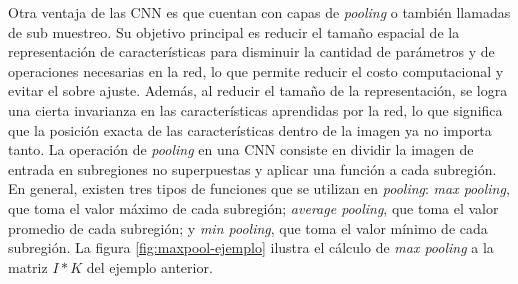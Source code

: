 Otra ventaja de las CNN es que cuentan con capas de {\it pooling} o también llamadas de sub muestreo. Su objetivo
principal es reducir el tamaño espacial de la representación de características para disminuir la cantidad de
parámetros y de operaciones necesarias en la red, lo que permite reducir el costo computacional y evitar el sobre
ajuste. Además, al reducir el tamaño de la representación, se logra una cierta invarianza en las características
aprendidas por la red, lo que significa que la posición exacta de las características dentro de la imagen ya no importa
tanto. La operación de {\it pooling} en una CNN consiste en dividir la imagen de entrada en subregiones no superpuestas
y aplicar una función a cada subregión. En general, existen tres tipos de funciones que se utilizan en {\it pooling}:
{\it max pooling}, que toma el valor máximo de cada subregión; {\it average pooling}, que toma el valor promedio de
cada subregión; y {\it min pooling}, que toma el valor mínimo de cada subregión. La figura \ref{fig:maxpool-ejemplo}
ilustra el cálculo de {\it max pooling} a la matriz $I*K$ del ejemplo anterior.

